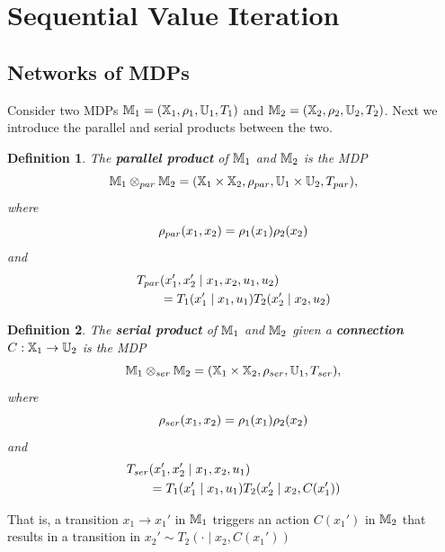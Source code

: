 \documentclass[conference]{IEEEtran}
\newtheorem{definition}{Definition}
\begin{document}
\section{Sequential Value Iteration}
\label{sec:sequential_val_iter}


\subsection{Networks of MDPs}

Consider two MDPs $\mathbb{M}_1 = (\mathbb{X}_1, \rho_1, \mathbb{U}_1, T_1)$ and $\mathbb{M}_2 = (\mathbb{X}_2, \rho_2, \mathbb{U}_2, T_2)$. Next we introduce the parallel and serial products between the two.
\begin{definition}
  The \textbf{parallel product} of $\mathbb{M}_1$ and $\mathbb{M}_2$ is the MDP 
  \begin{equation}
    \mathbb{M}_1 \otimes_{par} \mathbb{M}_2 = (\mathbb{X}_1 \times \mathbb{X}_2, \rho_{par}, \mathbb{U}_1 \times \mathbb{U}_2, T_{par}),
  \end{equation}
  where
  \begin{equation}
    \rho_{par}(x_1, x_2) = \rho_1(x_1) \rho_2(x_2)
  \end{equation}
  and
  \begin{equation}
  \begin{aligned}
      T_{par}&(x_1', x_2' \mid x_1, x_2, u_1, u_2) \\
      & = T_1 (x_1' \mid x_1, u_1) T_2 (x_2' \mid x_2, u_2)
  \end{aligned}
  \end{equation}
\end{definition}

\begin{definition}
  The \textbf{serial product} of $\mathbb{M}_1$ and $\mathbb{M}_2$ given a \textbf{connection} $C : \mathbb{X}_1 \rightarrow \mathbb{U}_2$ is the MDP 
  \begin{equation}
    \mathbb{M}_1 \otimes_{ser} \mathbb{M}_2 = (\mathbb{X}_1 \times \mathbb{X}_2, \rho_{ser}, \mathbb{U}_1, T_{ser}),
  \end{equation}
  where
  \begin{equation}
    \rho_{ser}(x_1, x_2) = \rho_1(x_1) \rho_2(x_2)
  \end{equation}
  and
  \begin{equation}
  \begin{aligned}
      T_{ser}&(x_1', x_2' \mid x_1, x_2, u_1) \\
      & = T_1 (x_1' \mid x_1, u_1) T_2 (x_2' \mid x_2, C(x_1') )
  \end{aligned}
  \end{equation}
\end{definition}
That is, a transition $x_1 \rightarrow x_1'$ in $\mathbb{M}_1$ triggers an action $C(x_1')$ in $\mathbb{M}_2$ that results in a transition in $x_2' \sim T_2(\cdot \mid x_2, C(x_1'))$
\end{document}
